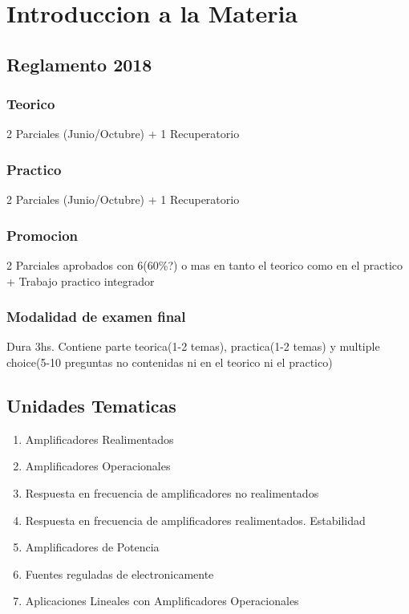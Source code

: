 \chapter*{Introduccion a la Materia}

\section*{Reglamento 2018}
\subsection*{Teorico}
2 Parciales (Junio/Octubre) + 1 Recuperatorio

\subsection*{Practico}
2 Parciales (Junio/Octubre) + 1 Recuperatorio

\subsection*{Promocion}
2 Parciales aprobados con 6(60\%?) o mas en tanto el teorico como en el 
practico + Trabajo practico integrador

\subsection*{Modalidad de examen final}
Dura 3hs. Contiene parte teorica(1-2 temas), practica(1-2 temas) y multiple 
choice(5-10 preguntas no contenidas ni en el teorico ni el practico)

\section*{Unidades Tematicas}
\begin{enumerate}
  \item Amplificadores Realimentados
  \item Amplificadores Operacionales
  \item Respuesta en frecuencia de amplificadores no realimentados
  \item Respuesta en frecuencia de amplificadores realimentados. Estabilidad
  \item Amplificadores de Potencia
  \item Fuentes reguladas de electronicamente
  \item Aplicaciones Lineales con Amplificadores Operacionales
\end{enumerate}
